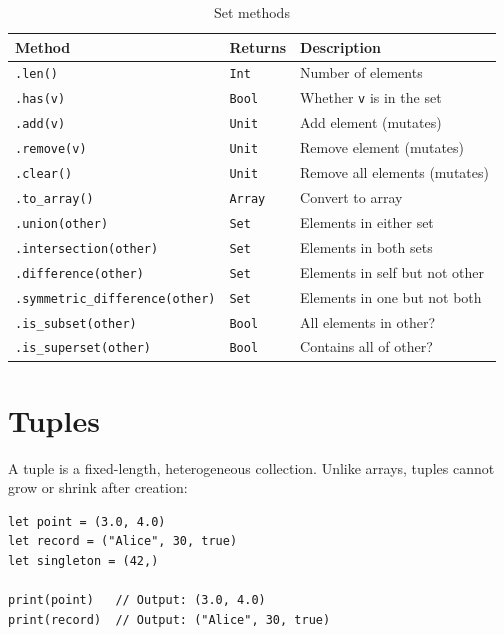 \begin{table}[ht]
\centering
\begin{tabular}{lll}
\toprule
\textbf{Method} & \textbf{Returns} & \textbf{Description} \\
\midrule
\lstinline|.len()| & \lstinline|Int| & Number of elements \\
\lstinline|.has(v)| & \lstinline|Bool| & Whether \lstinline|v| is in the set \\
\lstinline|.add(v)| & \lstinline|Unit| & Add element (mutates) \\
\lstinline|.remove(v)| & \lstinline|Unit| & Remove element (mutates) \\
\lstinline|.clear()| & \lstinline|Unit| & Remove all elements (mutates) \\
\lstinline|.to_array()| & \lstinline|Array| & Convert to array \\
\lstinline|.union(other)| & \lstinline|Set| & Elements in either set \\
\lstinline|.intersection(other)| & \lstinline|Set| & Elements in both sets \\
\lstinline|.difference(other)| & \lstinline|Set| & Elements in self but not other \\
\lstinline|.symmetric_difference(other)| & \lstinline|Set| & Elements in one but not both \\
\lstinline|.is_subset(other)| & \lstinline|Bool| & All elements in other? \\
\lstinline|.is_superset(other)| & \lstinline|Bool| & Contains all of other? \\
\bottomrule
\end{tabular}
\caption{Set methods}\label{tab:set-methods}
\end{table}

\section{Tuples}\label{sec:tuples}

A tuple is a fixed-length, heterogeneous collection. Unlike arrays, tuples cannot grow or shrink after creation:

\begin{lstlisting}[language=Lattice, caption={Creating tuples}]
let point = (3.0, 4.0)
let record = ("Alice", 30, true)
let singleton = (42,)

print(point)   // Output: (3.0, 4.0)
print(record)  // Output: ("Alice", 30, true)
\end{lstlisting}

